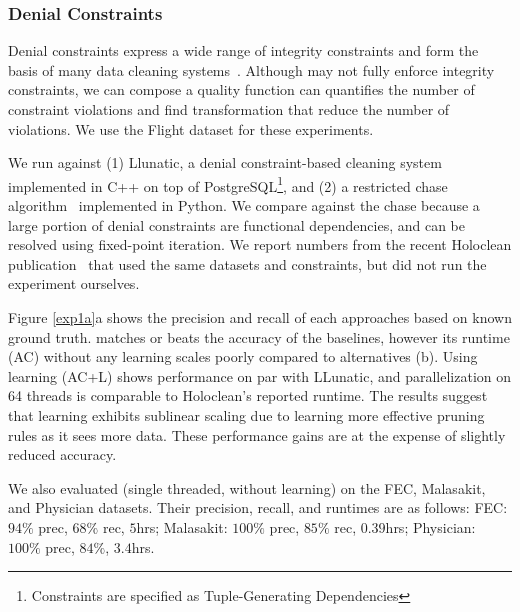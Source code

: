 \subsubsection{Denial Constraints}
Denial constraints express a wide range of integrity constraints and form the basis of many data cleaning systems~\cite{llunatic,chase,holoclean}.  Although \sys may not fully enforce integrity constraints, we can compose a quality function can quantifies the number of constraint violations and find transformation that reduce the number of violations.    We use the Flight dataset for these experiments.


 We run against (1) Llunatic, a denial constraint-based cleaning system~\cite{DBLP:conf/sigmod/DallachiesaEEEIOT13} implemented in C++ on top of PostgreSQL\footnote{Constraints are specified as Tuple-Generating Dependencies}, and (2) a restricted chase algorithm~\cite{benedikt2017benchmarking} implemented in Python. We compare against the chase because a large portion of denial constraints are functional dependencies, and can be resolved using fixed-point iteration.  We report numbers from the recent Holoclean publication~\cite{rekatsinas2017holoclean} that used the same datasets and constraints, but did not run the experiment ourselves.

 Figure \ref{exp1a}a shows the precision and recall of each approaches based on known ground truth. \sys matches or beats the accuracy of the baselines, however its runtime (AC) without any learning scales poorly compared to alternatives (b).  Using learning (AC+L) shows performance on par with LLunatic, and parallelization on 64 threads is comparable to Holoclean's reported runtime. The results suggest that learning exhibits sublinear scaling due to \sys learning more effective pruning rules as it sees more data.  These performance gains are at the expense of slightly reduced accuracy. 

We also evaluated \sys (single threaded, without learning) on the FEC, Malasakit, and Physician datasets.  Their precision, recall, and runtimes are as follows: 
FEC: $94\%$ prec, $68\%$ rec, $5$hrs; 
Malasakit: $100\%$ prec, $85\%$ rec, $0.39$hrs;
Physician: $100\%$ prec, $84\%$, $3.4$hrs.


